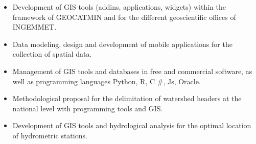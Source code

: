 \documentclass[10pt,a4paper,normalphoto]{altacv}
\begin{document}

\begin{fullwidth}
\makecvheader
\end{fullwidth}



\begin{itemize}
\item Development of GIS tools (addins, applications, widgets) within the framework of GEOCATMIN and for the different geoscientific offices of INGEMMET.
\item Data modeling, design and development of mobile applications for the collection of spatial data.
\item Management of GIS tools and databases in free and commercial software, as well as programming languages Python, R, C #, Js, Oracle.
\end{itemize}
\divider

\begin{itemize}
\item Methodological proposal for the delimitation of watershed headers at the national level with programming tools and GIS.
\item Development of GIS tools and hydrological analysis for the optimal location of hydrometric stations.
\end{itemize}
\divider
\end{document}
